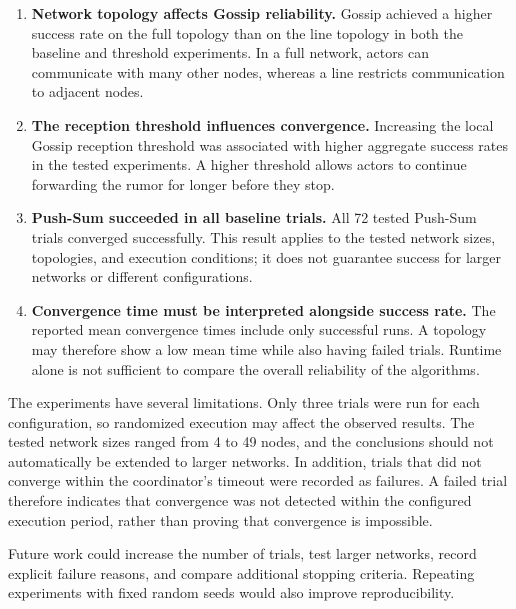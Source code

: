 \documentclass[11pt]{article}
\begin{document}
\begin{enumerate}
    \item \textbf{Network topology affects Gossip reliability.}
    Gossip achieved a higher success rate on the full topology than
    on the line topology in both the baseline and threshold experiments.
    In a full network, actors can communicate with many other nodes,
    whereas a line restricts communication to adjacent nodes.

    \item \textbf{The reception threshold influences convergence.}
    Increasing the local Gossip reception threshold was associated
    with higher aggregate success rates in the tested experiments.
    A higher threshold allows actors to continue forwarding the rumor
    for longer before they stop.

    \item \textbf{Push-Sum succeeded in all baseline trials.}
    All 72 tested Push-Sum trials converged successfully. This result
    applies to the tested network sizes, topologies, and execution
    conditions; it does not guarantee success for larger networks or
    different configurations.

    \item \textbf{Convergence time must be interpreted alongside
    success rate.}
    The reported mean convergence times include only successful runs.
    A topology may therefore show a low mean time while also having
    failed trials. Runtime alone is not sufficient to compare the
    overall reliability of the algorithms.
\end{enumerate}

The experiments have several limitations. Only three trials were run
for each configuration, so randomized execution may affect the
observed results. The tested network sizes ranged from 4 to 49 nodes,
and the conclusions should not automatically be extended to larger
networks. In addition, trials that did not converge within the
coordinator's timeout were recorded as failures. A failed trial
therefore indicates that convergence was not detected within the
configured execution period, rather than proving that convergence
is impossible.

Future work could increase the number of trials, test larger networks,
record explicit failure reasons, and compare additional stopping
criteria. Repeating experiments with fixed random seeds would also
improve reproducibility.
\par
\end{document}
